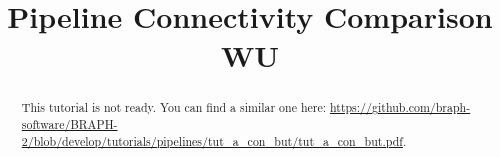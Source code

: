 \documentclass[justified]{tufte-handout}
\title{Pipeline Connectivity Comparison WU}
\begin{document}
\maketitle

\begin{abstract}
\noindent
This tutorial is not ready. You can find a similar one here: \url{https://github.com/braph-software/BRAPH-2/blob/develop/tutorials/pipelines/tut_a_con_but/tut_a_con_but.pdf}.
\end{abstract}
\end{document}
